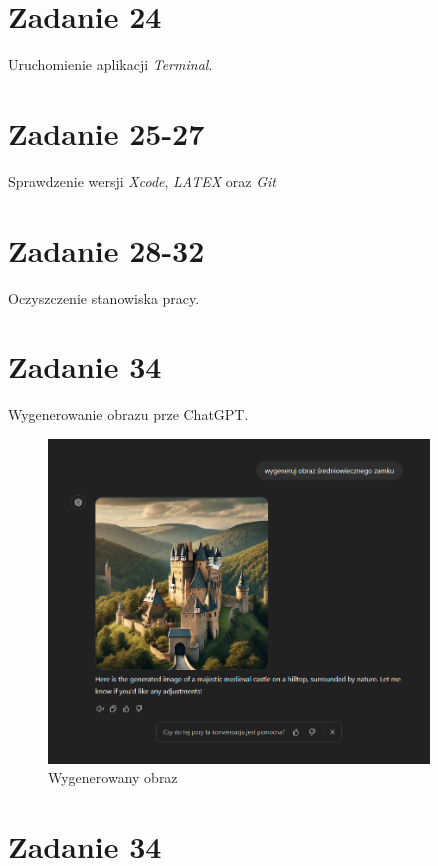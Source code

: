 \documentclass[fleqn,onecolumn,a4paper,12pt,titlepage]{article}
\begin{document}
\section*{Zadanie 24}

Uruchomienie aplikacji \textit{Terminal}.

\section*{Zadanie 25-27}

Sprawdzenie wersji \textit{Xcode}, \textit{LATEX} oraz \textit{Git}

\section*{Zadanie 28-32}

Oczyszczenie stanowiska pracy.

\newpage

\section*{Zadanie 34}

Wygenerowanie obrazu prze ChatGPT.
\begin{figure}[H]%
    \centering\includegraphics[width=0.9\textwidth]{gen01.png}
    \caption{Wygenerowany obraz}
    \label{fig:obraz wygenerowany przez ChatGPT}
\end{figure}

\newpage

\section*{Zadanie 34}
\end{document}
